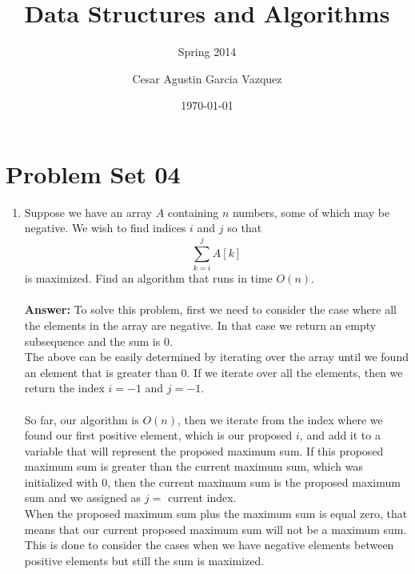 \documentclass[tikz, 12pt]{scrartcl}
\title{Data Structures and Algorithms}
\subtitle{Spring 2014}
\author{Cesar Agustin Garcia Vazquez}
\date{\today}                                           %
\begin{document}
\maketitle
\section{Problem Set 04}

\begin{enumerate}
	\item Suppose we have an array $A$ containing $n$ numbers, some of which may be negative. We wish to find indices $i$ and $j$ so that
	$$\sum_{k = i}^{j}A[k]$$
is maximized. Find an algorithm that runs in time $O(n)$.\\
\\
\textbf{Answer: } To solve this problem, first we need to consider the case where all the elements in the array are negative. In that case we return an empty subsequence and the sum is 0. \\
	The above can be easily determined by iterating over the array until we found an element that is greater than $0$. If we iterate over all the elements, then we return the index $i = -1$ and $j = -1$.\\
	\\
	So far, our algorithm is $O(n)$, then we iterate from the index where we found our first positive element, which is our proposed $i$, and add it to a variable that will represent the proposed maximum sum. If this proposed maximum sum is greater than the current maximum sum, which was initialized with 0, then the current maximum sum is the proposed maximum sum and we assigned as $j =$ current index. \\
	When the proposed maximum sum plus the maximum sum is equal zero, that means that our current proposed maximum sum will not be a maximum sum. This is done to consider the cases when we have negative elements between positive elements but still the sum is maximized.


\end{enumerate}
\end{document}
